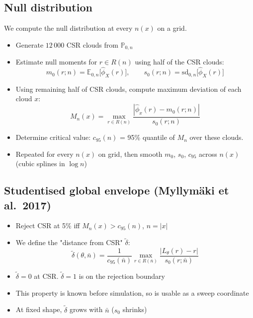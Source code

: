 \documentclass[11pt]{article}
\newcommand{\dt}{\tilde\delta}
\newcommand{\nb}{\bar n}
\begin{document}
\subsection*{Null distribution}
We compute the null distribution at every $n(x)$ on a grid.
\begin{itemize}
  \item Generate $12\,000$ CSR clouds from $\mathbb P_{0,n}$
  \item Estimate null moments for $r \in R(n)$ using half of the CSR clouds:
  \[
    m_0(r;n) = \mathbb E_{0,n}\big[\hat\phi_X(r)\big],
    \qquad
    s_0(r;n) = \mathrm{sd}_{0,n}\big[\hat\phi_X(r)\big]
  \]
  \item Using remaining half of CSR clouds, compute maximum deviation of each cloud $x$:
  \[
    M_n(x) = \max_{r\in R(n)} \frac{|\hat\phi_x(r) - m_0(r;n)|}{s_0(r;n)}
  \]
  \item Determine critical value: $c_{95}(n)$ = 95\% quantile of $M_n$ over these clouds.
  \item Repeated for every $n(x)$ on grid, then smooth $m_0$, $s_0$, $c_{95}$ across $n(x)$ (cubic splines in $\log n$)
\end{itemize}

\subsection*{Studentised global envelope (Myllym\"aki et al.\ 2017)}
\begin{itemize}
  \item Reject CSR at 5\% iff $M_n(x) > c_{95}(n)$, $n = |x|$
  \item We define the "distance from CSR" $\dt$:
    \[
      \dt(\theta,\nb) = \frac{1}{c_{95}(\nb)} \max_{r\in R(\nb)} \frac{|L_\theta(r) - r|}{s_0(r;\nb)}
    \]
  \item $\dt = 0$ at CSR. $\dt = 1$ is on the rejection boundary
  \item This property is known before simulation, so is usable as a sweep coordinate
  \item At fixed shape, $\dt$ grows with $\nb$ ($s_0$ shrinks)
\end{itemize}
\end{document}
